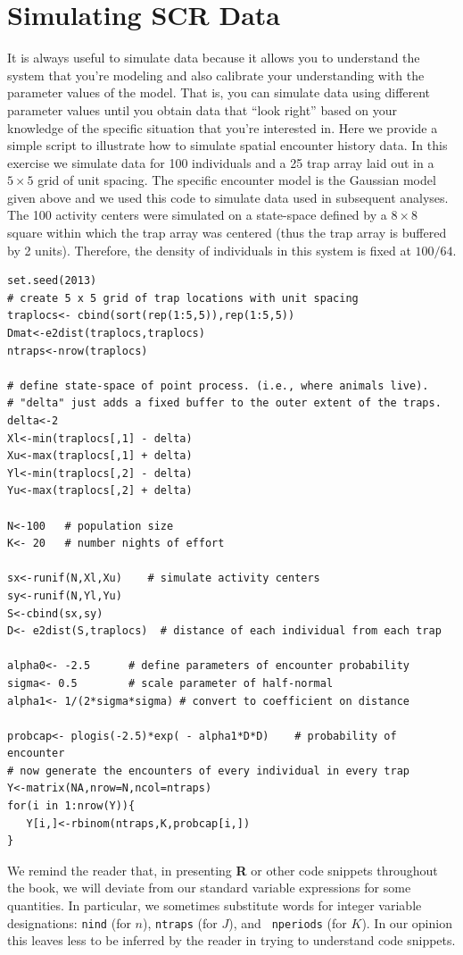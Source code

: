 \section{Simulating SCR Data}
\label{scr0.sec.simulating}

It is always useful to simulate data because it allows you to
understand the system that you're modeling and also calibrate your
understanding with the parameter values of the model. That is, you can
simulate data using different parameter values until you obtain data
that ``look right'' based on your knowledge of the specific situation
that you're interested in. Here we provide a simple script to
illustrate how to simulate spatial encounter history data. In this
exercise we simulate data for 100 individuals and a 25 trap array laid
out in a $5 \times 5$ grid of unit spacing.  The specific encounter
model is the Gaussian model given above and we used this code to
simulate data used in subsequent analyses.  The 100 activity centers
were simulated on a state-space defined by a $8 \times 8$ square
within which the trap array was centered (thus the trap array is
buffered by 2 units). Therefore, the density of individuals in this
system is fixed at $100/64$.

{\small
\begin{verbatim}
set.seed(2013)
# create 5 x 5 grid of trap locations with unit spacing
traplocs<- cbind(sort(rep(1:5,5)),rep(1:5,5))
Dmat<-e2dist(traplocs,traplocs) 
ntraps<-nrow(traplocs)

# define state-space of point process. (i.e., where animals live).
# "delta" just adds a fixed buffer to the outer extent of the traps.
delta<-2
Xl<-min(traplocs[,1] - delta)
Xu<-max(traplocs[,1] + delta)
Yl<-min(traplocs[,2] - delta)
Yu<-max(traplocs[,2] + delta)

N<-100   # population size
K<- 20   # number nights of effort

sx<-runif(N,Xl,Xu)    # simulate activity centers
sy<-runif(N,Yl,Yu)
S<-cbind(sx,sy)
D<- e2dist(S,traplocs)  # distance of each individual from each trap

alpha0<- -2.5      # define parameters of encounter probability
sigma<- 0.5        # scale parameter of half-normal
alpha1<- 1/(2*sigma*sigma) # convert to coefficient on distance

probcap<- plogis(-2.5)*exp( - alpha1*D*D)    # probability of encounter 
# now generate the encounters of every individual in every trap
Y<-matrix(NA,nrow=N,ncol=ntraps)
for(i in 1:nrow(Y)){
   Y[i,]<-rbinom(ntraps,K,probcap[i,])
}
\end{verbatim}
}
We remind the reader that, in presenting {\bf R} or other code snippets
throughout the book, we will deviate from our standard variable
expressions for some quantities. 
In particular, we sometimes 
substitute words for integer variable designations:
\mbox{\tt nind} (for $n$), \mbox{\tt ntraps} (for $J$), and \mbox{\tt
 nperiods} (for $K$). In our opinion this leaves less to be inferred
by the reader in trying to understand code snippets.

